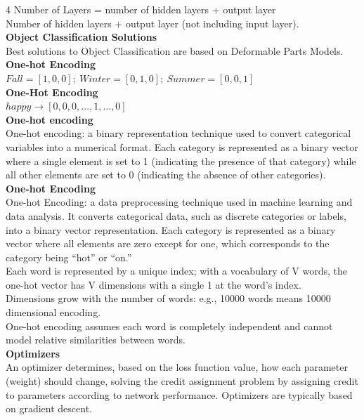 \documentclass[8pt]{extarticle}
\begin{document}
\begin{multicols}{4}
Number of Layers = number of hidden layers + output layer\\
Number of hidden layers + output layer (not including input layer).\\
\vspace{2pt}\textbf{Object Classification Solutions}\\
Best solutions to Object Classification are based on Deformable Parts Models.\\
\vspace{2pt}\textbf{One-hot Encoding}\\
$Fall = [1, 0, 0];\ Winter = [0, 1, 0];\ Summer = [0, 0, 1]$\\
\vspace{2pt}\textbf{One-Hot Encoding}\\
$happy \rightarrow [0, 0, 0, \dots , 1 , \dots , 0]$\\
\vspace{2pt}\textbf{One-hot encoding}\\
One-hot encoding: a binary representation technique used to convert categorical variables into a numerical format. Each category is represented as a binary vector where a single element is set to 1 (indicating the presence of that category) while all other elements are set to 0 (indicating the absence of other categories).\\
\vspace{2pt}\textbf{One-hot Encoding}\\
One-hot Encoding: a data preprocessing technique used in machine learning and data analysis. It converts categorical data, such as discrete categories or labels, into a binary vector representation. Each category is represented as a binary vector where all elements are zero except for one, which corresponds to the category being “hot” or “on.”\\
Each word is represented by a unique index; with a vocabulary of V words, the one-hot vector has V dimensions with a single 1 at the word’s index.\\
Dimensions grow with the number of words: e.g., 10000 words means 10000 dimensional encoding.\\
One-hot encoding assumes each word is completely independent and cannot model relative similarities between words.\\
\vspace{2pt}\textbf{Optimizers}\\
An optimizer determines, based on the loss function value, how each parameter (weight) should change, solving the credit assignment problem by assigning credit to parameters according to network performance. Optimizers are typically based on gradient descent.\\

\end{multicols}
\end{document}
